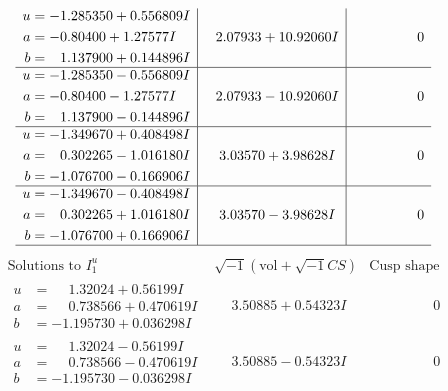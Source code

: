 \documentclass[1p]{elsarticle_modified}
\theoremstyle{definition}
\newcommand{\I}{\sqrt{-1}}
\begin{document}
$$\begin{array}{c|c|c}
\begin{aligned}
u &= -1.285350 + 0.556809 I \\
a &= -0.80400 + 1.27577 I \\
b &= \phantom{-}1.137900 + 0.144896 I\end{aligned}
 & \phantom{-}2.07933 + 10.92060 I & \phantom{-0.000000 } 0 \\ \hline\begin{aligned}
u &= -1.285350 - 0.556809 I \\
a &= -0.80400 - 1.27577 I \\
b &= \phantom{-}1.137900 - 0.144896 I\end{aligned}
 & \phantom{-}2.07933 - 10.92060 I & \phantom{-0.000000 } 0 \\ \hline\begin{aligned}
u &= -1.349670 + 0.408498 I \\
a &= \phantom{-}0.302265 - 1.016180 I \\
b &= -1.076700 - 0.166906 I\end{aligned}
 & \phantom{-}3.03570 + 3.98628 I & \phantom{-0.000000 } 0 \\ \hline\begin{aligned}
u &= -1.349670 - 0.408498 I \\
a &= \phantom{-}0.302265 + 1.016180 I \\
b &= -1.076700 + 0.166906 I\end{aligned}
 & \phantom{-}3.03570 - 3.98628 I & \phantom{-0.000000 } 0\\
 \hline 
 \end{array}$$\newpage$$\begin{array}{c|c|c}  
\text{Solutions to }I^u_{1}& \I (\text{vol} + \sqrt{-1}CS) & \text{Cusp shape}\\
 \hline 
\begin{aligned}
u &= \phantom{-}1.32024 + 0.56199 I \\
a &= \phantom{-}0.738566 + 0.470619 I \\
b &= -1.195730 + 0.036298 I\end{aligned}
 & \phantom{-}3.50885 + 0.54323 I & \phantom{-0.000000 } 0 \\ \hline\begin{aligned}
u &= \phantom{-}1.32024 - 0.56199 I \\
a &= \phantom{-}0.738566 - 0.470619 I \\
b &= -1.195730 - 0.036298 I\end{aligned}
 & \phantom{-}3.50885 - 0.54323 I & \phantom{-0.000000 } 0 \\ \hline\begin{aligned}

\end{aligned}
\end{array}$$
\end{document}
